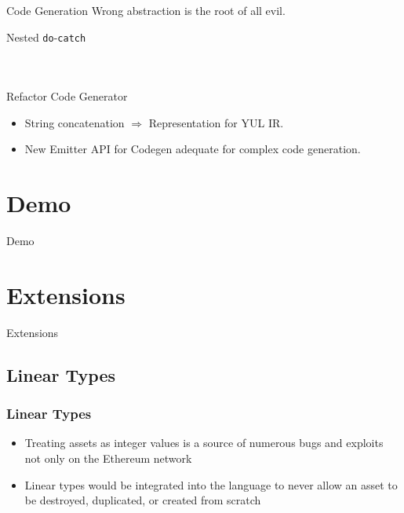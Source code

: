 \documentclass[aspectratio=169]{beamer}
\newcommand{\sectionslide}[1]{%
  \section{#1}
  \begin{frame}
  \begin{center}
    \vbox{}
    {\LARGE \usebeamercolor[fg]{title} #1}
    \par
  \end{center}
  \end{frame}
}
\begin{document}
\begin{frame}{Code Generation}
\centering
Wrong abstraction is the root of all evil.
\end{frame}

\begin{frame}{Nested \texttt{do}-\texttt{catch}}
\begin{columns}
    \begin{column}{0.5\textwidth}
        \inputminted[fontsize=\small]{swift}{code/nested-do.flint}
    \end{column}
    \begin{column}{0.5\textwidth}
        \inputminted[fontsize=\small]{swift}{code/nested-do-catch.flint}
    \end{column}
\end{columns}
\end{frame}

\begin{frame}{Refactor Code Generator}
\begin{itemize}
    \item String concatenation $\Rightarrow$ Representation for YUL IR.
    \item New Emitter API for Codegen adequate for complex code generation.
\end{itemize}
\end{frame}

\sectionslide{Demo}

\sectionslide{Extensions}
\subsection{Linear Types}

\begin{frame}
\frametitle{Linear Types}
\begin{itemize}
    \item Treating assets as integer values is a source of numerous bugs and exploits not only on the Ethereum network
    \item Linear types would be integrated into the language to never allow an asset to be destroyed, duplicated, or created from scratch
\end{itemize}
\end{frame}
\end{document}
